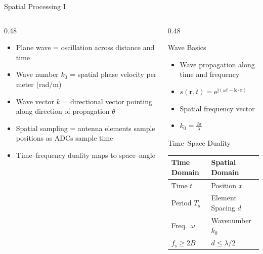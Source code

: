 \begin{frame}{Spatial Processing I}
    \begin{columns}[onlytextwidth]
        \begin{column}{0.48\textwidth}
            \begin{itemize}
                \item Plane wave = oscillation across distance and time
                \item Wave number $k_0$ = spatial phase velocity per meter ($\mathrm{rad/m}$)
                \item Wave vector $k$ = directional vector pointing along direction of propagation $\theta$
                \item Spatial sampling = antenna elements sample positions as ADCs sample time
                \item Time--frequency duality maps to space--angle
            \end{itemize}
        \end{column}

        \begin{column}{0.48\textwidth}
            \begin{block}{Wave Basics}
                \begin{itemize}
                    \item Wave propagation along time and frequency
                    \item $s(\mathbf{r}, t) = \mathrm{e}^{\mathrm{j}(\omega t - \mathbf{k} \cdot \mathbf{r})}$
                    \item Spatial frequency vector
                    \item $k_0 = \frac{2 \pi}{\lambda}$
                \end{itemize}
            \end{block}

            \begin{block}{Time--Space Duality}
            \begin{tabular}{ll}
                \hline
                \textbf{Time Domain} & \textbf{Spatial Domain} \\ 
                \hline
                Time $t$ & Position $x$ \\
                Period $T_\mathrm{s}$ & Element Spacing $d$ \\
                Freq.\ $\omega$ & Wavenumber $k_0$ \\
                $f_\mathrm{s} \ge 2B$ & $d \le \lambda / 2$ \\ 
                \hline
            \end{tabular}
            \end{block}
        \end{column}
    \end{columns}
\end{frame}

